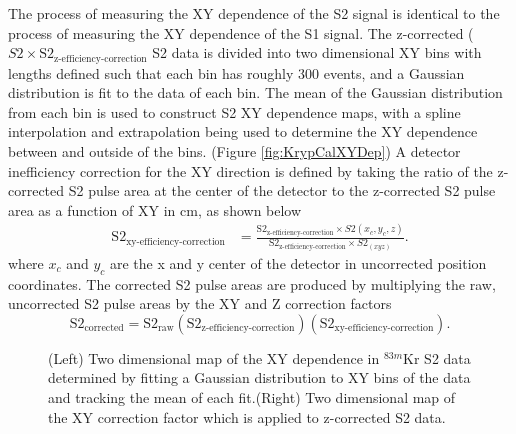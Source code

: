 \documentclass[a4paper,12pt]{article}
\begin{document}
{The process of measuring the XY dependence of the S2 signal is identical to the process of measuring the XY dependence of the S1 signal.  The z-corrected ($S2 \times \mbox{S}2_{\mbox{z-efficiency-correction}}$ S2 data is divided into two dimensional XY bins with lengths defined such that each bin has roughly 300 events, and a Gaussian distribution is fit to the data of each bin.  The mean of the Gaussian distribution from each bin is used to construct S2 XY dependence maps, with a spline interpolation and extrapolation being used to determine the XY dependence between and outside of the bins. (Figure \ref{fig:KrypCalXYDep}) A detector inefficiency correction for the XY direction is defined by taking the ratio of the z-corrected S2 pulse area at the center of the detector to the z-corrected S2 pulse area as a function of XY in cm, as shown below
\begin{align}
\mbox{S}2_{\mbox{xy-efficiency-correction}} &= \frac{\mbox{S}2_{\mbox{z-efficiency-correction}}\times S2(x_c,y_c,z)}{\mbox{S}2_{\mbox{z-efficiency-correction}}\times S2_(xyz)}.
\end{align} 
where $x_c$ and $y_c$ are the x and y center of the detector in uncorrected position coordinates. The corrected S2 pulse areas are produced by multiplying the raw, uncorrected S2 pulse areas by the XY and Z correction factors
\begin{equation}
\mbox{S}2_{\mbox{corrected}} = \mbox{S}2_{\mbox{raw}} \left( \mbox{S}2_{\mbox{z-efficiency-correction}} \right) \left( \mbox{S}2_{\mbox{xy-efficiency-correction}} \right).
\end{equation}

\begin{figure} 
\centering
{}
\qquad
{}
\caption{ (Left) Two dimensional map of the XY dependence in $^{83m}$Kr S2 data determined by fitting a Gaussian distribution to XY bins of the data and tracking the mean of each fit.(Right) Two dimensional map of the XY correction factor which is applied to z-corrected S2 data.}
\label{fig:KrypCalS2XYDep}
\end{figure}

}
\end{document}
